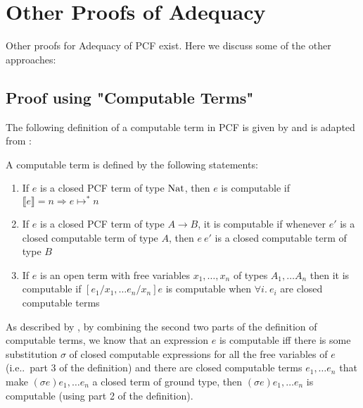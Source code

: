 \section{Other Proofs of Adequacy}\label{ch8}
Other proofs for Adequacy of PCF exist. Here we discuss some of the other approaches:

\subsection{Proof using "Computable Terms"}
The following definition of a computable term in PCF is given by \citep{Gunter92} and is adapted from \citep{Plotkin77}:

\vspace{0.5cm}

\begin{defn} A computable term is defined by the following statements:
\begin{enumerate}
\item{If $e$ is a closed PCF term of type $\operatorname{Nat}$, then $e$ is computable if $\llbracket e \rrbracket = n \Rightarrow e \mapsto^* n$}
\item{If $e$ is a closed PCF term of type $A \to B$, it is computable if whenever $e'$ is a closed computable term of type $A$, then $e \ e'$ is a closed computable term of type $B$}
\item{If $e$ is an open term with free variables $x_1, \dots, x_n$ of types $A_1, \dots A_n$ then it is computable if $[e_1/x_1, \dots e_n/x_n]e$ is computable when $\forall i. \ e_i$ are closed computable terms}
\end{enumerate}
\end{defn}  

As described by \citep{Gunter92}, by combining the second two parts of the definition of computable terms, we know that an expression $e$ is computable iff there is some substitution $\sigma$ of closed computable expressions for all the free variables of $e$ (i.e..\ part 3 of the definition) and there are closed computable terms $e_1, \dots e_n$ that make $(\sigma e)e_1, \dots e_n$ a closed term of ground type, then  $(\sigma e)e_1, \dots e_n$ is computable (using part 2 of the definition).  


